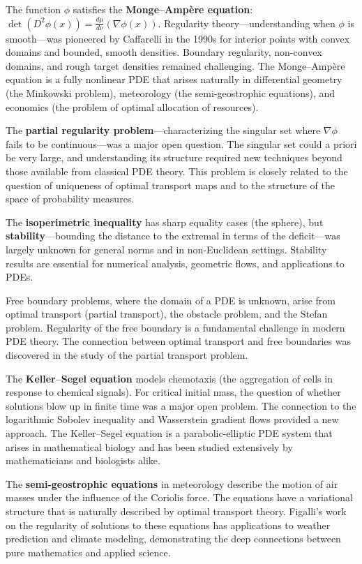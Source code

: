 The function $\phi$ satisfies the \textbf{Monge--Amp\`ere equation}: $\det(D^2\phi(x)) = \frac{d\mu}{d\nu}(\nabla\phi(x))$. Regularity theory---understanding when $\phi$ is smooth---was pioneered by Caffarelli in the 1990s for interior points with convex domains and bounded, smooth densities. Boundary regularity, non-convex domains, and rough target densities remained challenging. The Monge--Amp\`ere equation is a fully nonlinear PDE that arises naturally in differential geometry (the Minkowski problem), meteorology (the semi-geostrophic equations), and economics (the problem of optimal allocation of resources).

The \textbf{partial regularity problem}---characterizing the singular set where $\nabla\phi$ fails to be continuous---was a major open question. The singular set could a priori be very large, and understanding its structure required new techniques beyond those available from classical PDE theory. This problem is closely related to the question of uniqueness of optimal transport maps and to the structure of the space of probability measures.

The \textbf{isoperimetric inequality} has sharp equality cases (the sphere), but \textbf{stability}---bounding the distance to the extremal in terms of the deficit---was largely unknown for general norms and in non-Euclidean settings. Stability results are essential for numerical analysis, geometric flows, and applications to PDEs.

Free boundary problems, where the domain of a PDE is unknown, arise from optimal transport (partial transport), the obstacle problem, and the Stefan problem. Regularity of the free boundary is a fundamental challenge in modern PDE theory. The connection between optimal transport and free boundaries was discovered in the study of the partial transport problem.

The \textbf{Keller--Segel equation} models chemotaxis (the aggregation of cells in response to chemical signals). For critical initial mass, the question of whether solutions blow up in finite time was a major open problem. The connection to the logarithmic Sobolev inequality and Wasserstein gradient flows provided a new approach. The Keller--Segel equation is a parabolic-elliptic PDE system that arises in mathematical biology and has been studied extensively by mathematicians and biologists alike.

The \textbf{semi-geostrophic equations} in meteorology describe the motion of air masses under the influence of the Coriolis force. The equations have a variational structure that is naturally described by optimal transport theory. Figalli's work on the regularity of solutions to these equations has applications to weather prediction and climate modeling, demonstrating the deep connections between pure mathematics and applied science.

